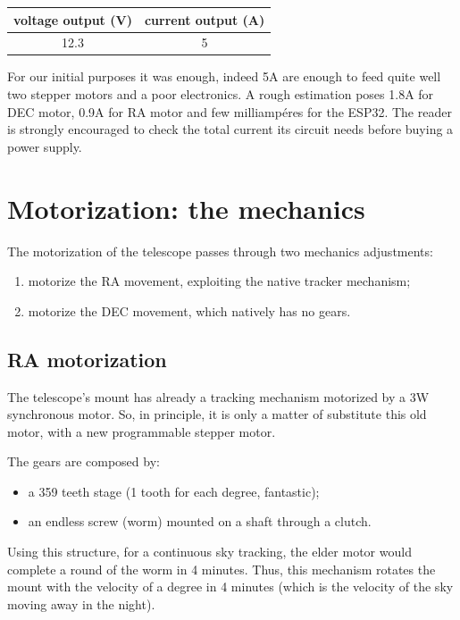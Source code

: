 \documentclass{article}
\begin{document}
\begin{multicols}{2}
        \begin{minipage}
            {.5\textwidth}
            \centering
            \begin{tabular}{cc}
                 voltage output (V) & current output (A) \\
                 \hline
                12.3 & 5 \\
            \end{tabular}
            \label{tab:power_supply}
        \end{minipage}

        For our initial purposes it was enough, indeed 5A are enough to feed quite well two stepper motors and a poor electronics.
        A rough estimation poses 1.8A for DEC motor, 0.9A for RA motor and few milliampéres for the ESP32. 
        The reader is strongly encouraged to check the total current its circuit needs before buying a power supply.

        \section{Motorization: the mechanics}
        The motorization of the telescope passes through two mechanics adjustments:
        \begin{enumerate}
            \item motorize the RA movement, exploiting the native tracker mechanism;
            \item motorize the DEC movement, which natively has no gears.
        \end{enumerate}

        \subsection{RA motorization}
        The telescope's mount has already a tracking mechanism motorized by a 3W synchronous motor.
        So, in principle, it is only a matter of substitute this old motor, with a new programmable stepper motor.

        The gears are composed by:
        \begin{itemize}
            \item a 359 teeth stage (1 tooth for each degree, fantastic);
            \item an endless screw (worm) mounted on a shaft through a clutch.
        \end{itemize}
        Using this structure, for a continuous sky tracking, the elder motor would complete a round of the worm in 4 minutes.
        Thus, this mechanism rotates the mount with the velocity of a degree in 4 minutes (which is the velocity of the sky moving away in the night).


\end{multicols}
\end{document}
